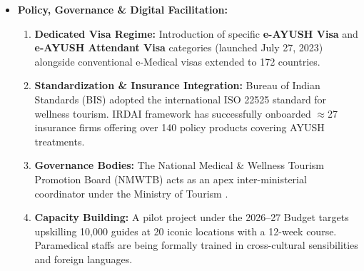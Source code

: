 \begin{itemize}
    \item \textbf{Policy, Governance \& Digital Facilitation:}
    \begin{enumerate}
        \item \textbf{Dedicated Visa Regime:} Introduction of specific \textbf{e-AYUSH Visa} and \textbf{e-AYUSH Attendant Visa} categories (launched July 27, 2023) alongside conventional e-Medical visas extended to 172 countries.
        \item \textbf{Standardization \& Insurance Integration:} Bureau of Indian Standards (BIS) adopted the international ISO 22525 standard for wellness tourism. IRDAI framework has successfully onboarded $\approx$27 insurance firms offering over 140 policy products covering AYUSH treatments.
        \item \textbf{Governance Bodies:} The National Medical \& Wellness Tourism Promotion Board (NMWTB) acts as an apex inter-ministerial coordinator under the Ministry of Tourism .
        \item \textbf{Capacity Building:} A pilot project under the 2026--27 Budget targets upskilling 10,000 guides at 20 iconic locations with a 12-week course. Paramedical staffs are being formally trained in cross-cultural sensibilities and foreign languages.
    \end{enumerate}
\end{itemize}